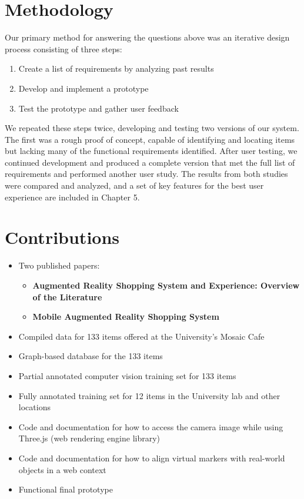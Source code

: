 \documentclass[thesis]{fputhesis}
\begin{document}
\begin{body}
\section{Methodology}
Our primary method for answering the questions above was an iterative design process consisting of three steps: 
\begin{enumerate}
    \item Create a list of requirements by analyzing past results
    \item Develop and implement a prototype
    \item Test the prototype and gather user feedback
\end{enumerate}
We repeated these steps twice, developing and testing two versions of our system. The first was a rough proof of concept, capable of identifying and locating items but lacking many of the functional requirements identified. After user testing, we continued development and produced a complete version that met the full list of requirements and performed another user study. The results from both studies were compared and analyzed, and a set of key features for the best user experience are included in Chapter 5.
\section{Contributions}
\begin{itemize}
    \item {Two published papers:
    \begin{itemize}
         \item []{\textbf{Augmented Reality Shopping System and Experience: Overview of the Literature}\cite{roche_augmented_2023}}
         \item []{\textbf{Mobile Augmented Reality Shopping System}\cite{roche_mobile_2023}}
    \end{itemize}
    }
    \item Compiled data for 133 items offered at the University's Mosaic Cafe
    \item Graph-based database for the 133 items
    \item Partial annotated computer vision training set for 133 items
    \item Fully annotated training set for 12 items in the University lab and other locations
    \item Code and documentation for how to access the camera image while using Three.js (web rendering engine library)
    \item Code and documentation for how to align virtual markers with real-world objects in a web context
    \item Functional final prototype
\end{itemize}


\end{body}
\end{document}
